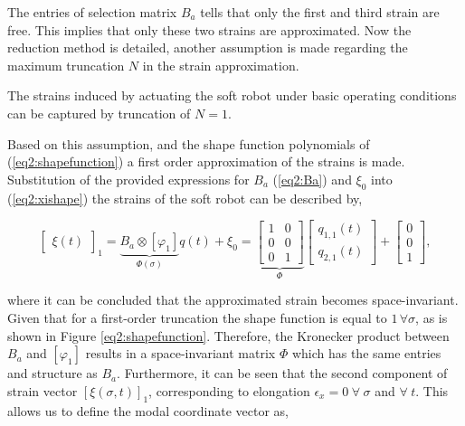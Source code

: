 The entries of selection matrix $B_a$ tells that only the first and third strain are free. This implies that only these two strains are approximated. Now the reduction method is detailed, another assumption is made regarding the maximum truncation $N$ in the strain approximation.

\begin{theorem}
The strains induced by actuating the soft robot under basic operating conditions can be captured by truncation of $N = 1$. 
\end{theorem}

Based on this assumption, and the shape function polynomials of (\ref{eq2:shapefunction}) a first order approximation of the strains is made. Substitution of the provided expressions for $B_a$ (\ref{eq2:Ba}) and $\xi_0$ into (\ref{eq2:xishape}) the strains of the soft robot can be described by,


\begin{equation}
    \begin{bmatrix}\xi(t)\end{bmatrix}_1 =\underbrace{B_a \otimes [\varphi_1]}_{\Phi(\sigma)} q(t) + \xi_0  =  \underbrace{\begin{bmatrix}
    1 & 0  \\
    0 & 0  \\
    0 & 1
    \end{bmatrix}}_{\Phi} \begin{bmatrix} q_{1,1}(t) \\  q_{2,1}(t) \end{bmatrix} +  \begin{bmatrix} 0 \\ 0 \\ 1   \end{bmatrix},
\label{eq2:xiapprox}
\end{equation}

where it can be concluded that the approximated strain becomes space-invariant. Given that for a first-order truncation the shape function is equal to $1 \hspace{2pt} \forall \sigma$, as is shown in Figure \ref{eq2:shapefunction}. Therefore, the Kronecker product between $B_a$ and $[\varphi_1]$ results in a space-invariant matrix $\Phi$ which has the same entries and structure as $B_a$. Furthermore, it can be seen that the second component of strain vector $[\xi(\sigma,t)]_1$, corresponding to elongation $\epsilon_x = 0 \hspace{3pt} \forall \hspace{3pt} \sigma $ and $ \forall \hspace{3pt} t$. This allows us to define the modal coordinate vector as,


